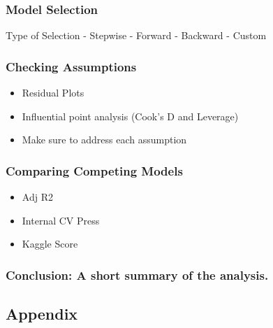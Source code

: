 \documentclass[
]{article}
\providecommand{\tightlist}{%
  \setlength{\itemsep}{0pt}\setlength{\parskip}{0pt}}
\begin{document}
\hypertarget{model-selection}{%
\subsubsection{Model Selection}\label{model-selection}}

Type of Selection - Stepwise - Forward - Backward - Custom

\hypertarget{checking-assumptions-1}{%
\subsubsection{Checking Assumptions}\label{checking-assumptions-1}}

\begin{itemize}
\tightlist
\item
  Residual Plots
\item
  Influential point analysis (Cook's D and Leverage)
\item
  Make sure to address each assumption
\end{itemize}

\hypertarget{comparing-competing-models-1}{%
\subsubsection{Comparing Competing
Models}\label{comparing-competing-models-1}}

\begin{itemize}
\tightlist
\item
  Adj R2\\
\item
  Internal CV Press\\
\item
  Kaggle Score
\end{itemize}

\hypertarget{conclusion-a-short-summary-of-the-analysis.}{%
\subsubsection{Conclusion: A short summary of the
analysis.}\label{conclusion-a-short-summary-of-the-analysis.}}

\hypertarget{appendix}{%
\subsection{Appendix}\label{appendix}}
\end{document}
